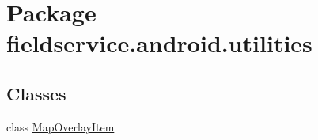 \hypertarget{namespacefieldservice_1_1android_1_1utilities}{\section{Package fieldservice.\+android.\+utilities}
\label{namespacefieldservice_1_1android_1_1utilities}
}
\subsection*{Classes}
\begin{DoxyCompactItemize}
\item 
class \hyperlink{classfieldservice_1_1android_1_1utilities_1_1_map_overlay_item}{Map\+Overlay\+Item}
\end{DoxyCompactItemize}
